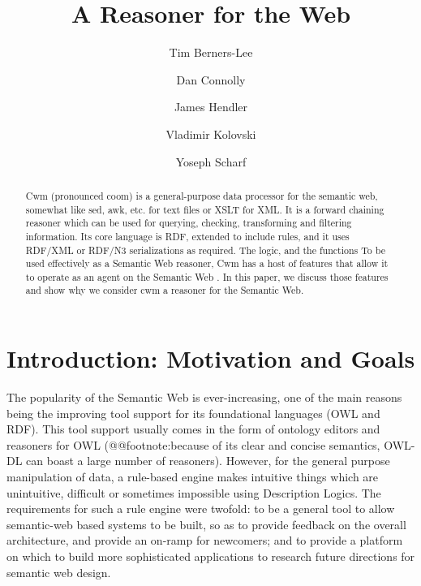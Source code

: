 \documentclass{tlp}
\begin{document}
   


\title{A Reasoner for the Web}
\author[Berners-Lee et. al.]{Tim Berners-Lee \and Dan Connolly \and James Hendler \and Vladimir Kolovski \and Yoseph Scharf}
  \maketitle
\label{firstpage}
  

    \begin{abstract}
  


\par Cwm (pronounced coom) is a general-purpose data processor for
the semantic web, somewhat like sed, awk, etc. for text files or
XSLT for XML. It is a forward chaining reasoner which can be used
for querying, checking, transforming and filtering information. Its
core language is RDF, extended to include rules, and it uses
RDF/XML or RDF/N3 serializations as required. The logic, and the
functions To be used effectively as a Semantic Web reasoner, Cwm
has a host of features that allow it to operate as an agent on the
Semantic Web . In this paper, we discuss those features and show
why we consider cwm a reasoner for the Semantic Web.
\end{abstract}
  


\section{Introduction: Motivation and Goals}
  

\par The popularity of the Semantic Web is ever-increasing, one of
the main reasons being the improving tool support for its
foundational languages (OWL and RDF). This tool support usually
comes in the form of ontology editors and reasoners for OWL
(@@footnote:because of its clear and concise semantics, OWL-DL can
boast a large number of reasoners). However, for the general
purpose manipulation of data, a rule-based engine makes intuitive
things which are unintuitive, difficult or sometimes impossible
using Description Logics. The requirements for such a rule engine
were twofold: to be a general tool to allow semantic-web based
systems to be built, so as to provide feedback on the overall
architecture, and provide an on-ramp for newcomers; and to provide
a platform on which to build more sophisticated applications to
research future directions for semantic web design.
\end{document}
